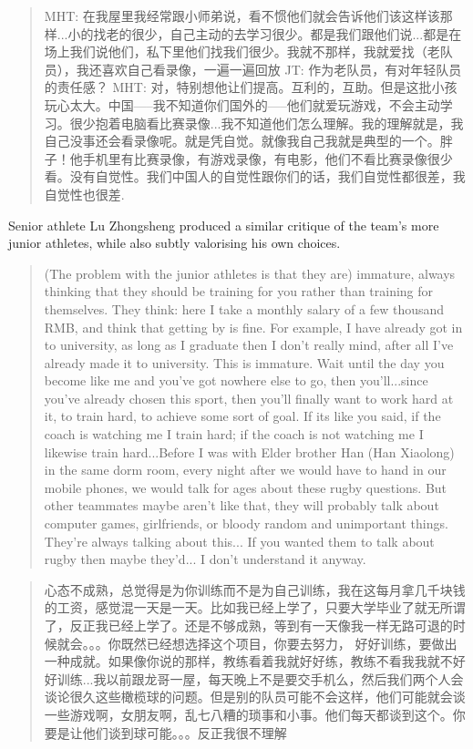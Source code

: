 \begin{CJK}{UTF8}{gbsn}
  \begin{quotation}
    MHT: 在我屋里我经常跟小师弟说，看不惯他们就会告诉他们该这样该那样...小的找老的很少，自己主动的去学习很少。都是我们跟他们说...都是在场上我们说他们，私下里他们找我们很少。我就不那样，我就爱找（老队员），我还喜欢自己看录像，一遍一遍回放
    JT: 作为老队员，有对年轻队员的责任感？
    MHT: 对，特别想他让们提高。互利的，互助。但是这批小孩玩心太大。中国—--我不知道你们国外的—--他们就爱玩游戏，不会主动学习。很少抱着电脑看比赛录像...我不知道他们怎么理解。我的理解就是，我自己没事还会看录像呢。就是凭自觉。就像我自己我就是典型的一个。胖子！他手机里有比赛录像，有游戏录像，有电影，他们不看比赛录像很少看。没有自觉性。我们中国人的自觉性跟你们的话，我们自觉性都很差，我自觉性也很差.
  \end{quotation}



Senior athlete Lu Zhongsheng produced a similar critique of the team's more junior athletes, while also subtly valorising his own choices.

\begin{quotation}
  (The problem with the junior athletes is that they are) immature, always thinking that they should be training for you rather than training for themselves.  They think: here I take a monthly salary of a few thousand RMB, and think that getting by is fine.  For example, I have already got in to university, as long as I graduate then I don't really mind, after all I've already made it to university.  This is immature.  Wait until the day you become like me and you've got nowhere else to go, then you'll...since you've already chosen this sport, then you'll finally want to work hard at it, to train hard, to achieve some sort of goal. If its like you said, if the coach is watching me I train hard; if the coach is not watching me I likewise train hard...Before I was with Elder brother Han (Han Xiaolong) in the same dorm room, every night after we would have to hand in our mobile phones, we would talk for ages about these rugby questions. But other teammates maybe aren't like that, they will probably talk about computer games, girlfriends, or bloody random and unimportant things.  They're always talking about this... If you wanted them to talk about rugby then maybe they'd... I don't understand it anyway.
\end{quotation}

\begin{quotation}
  心态不成熟，总觉得是为你训练而不是为自己训练，我在这每月拿几千块钱的工资，感觉混一天是一天。比如我已经上学了，只要大学毕业了就无所谓了，反正我已经上学了。还是不够成熟，等到有一天像我一样无路可退的时候就会。。。你既然已经想选择这个项目，你要去努力， 好好训练，要做出一种成就。如果像你说的那样，教练看着我就好好练，教练不看我我就不好好训练...我以前跟龙哥一屋，每天晚上不是要交手机么，然后我们两个人会谈论很久这些橄榄球的问题。但是别的队员可能不会这样，他们可能就会谈一些游戏啊，女朋友啊，乱七八糟的琐事和小事。他们每天都谈到这个。你要是让他们谈到球可能。。。反正我很不理解
\end{quotation}



\end{CJK}
